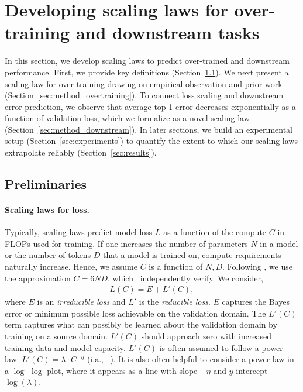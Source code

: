 \section{Developing scaling laws for over-training and downstream tasks}
\label{sec:method}

In this section, we develop scaling laws to predict over-trained and downstream performance. 
First, we provide key definitions (Section~\ref{sec:def}).
We next present a scaling law for over-training drawing on empirical observation and prior work (Section~\ref{sec:method_overtraining}).
To connect loss scaling and downstream error prediction, we observe that average top-1 error decreases exponentially as a function of validation loss, which we formalize as a novel scaling law (Section~\ref{sec:method_downstream}).
In later sections, we build an experimental setup (Section~\ref{sec:experiments}) to quantify the extent to which our scaling laws extrapolate reliably (Section~\ref{sec:results}).

\subsection{Preliminaries}
\label{sec:def}

\paragraph{Scaling laws for loss.}
Typically, scaling laws predict model loss $L$ as a function of the compute $C$ in FLOPs used for training.
If one increases the number of parameters $N$ in a model or the number of tokens $D$ that a model is trained on, compute requirements naturally increase.
Hence, we assume $C$ is a function of $N, D$.
Following \citet{kaplan2020scaling}, we use the approximation $C=6ND$, which~\citet{chinchilla} independently verify.
We consider,
\begin{align}
\label{eq:general}
L(C) = E + L'(C),
\end{align}
where $E$ is an \emph{irreducible loss} and $L'$ is the \emph{reducible loss}.
$E$ captures the Bayes error or minimum possible loss achievable on the validation domain.
The $L'(C)$ term captures what can possibly be learned about the validation domain by training on a source domain.
$L'(C)$ should approach zero with increased training data and model capacity.
$L'(C)$ is often assumed to follow a power law: $L'(C) = \lambda \cdot C ^ {-\eta}$ (i.a., ~\citet{og_scaling,gpt4}).
It is also often helpful to consider a power law in a $\log$-$\log$ plot, where it appears as a line with slope $-\eta$ and $y$-intercept $\log{(\lambda)}$.

